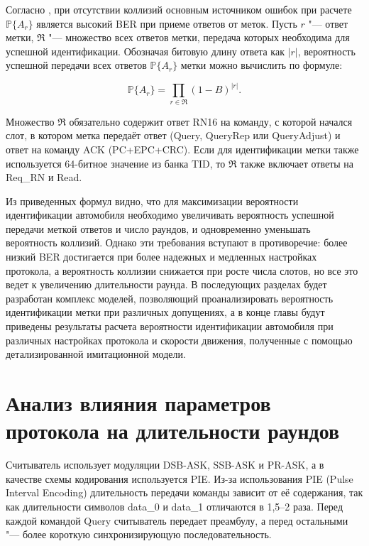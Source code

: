 Согласно \cite{Nikitin2008}, при отсутствии коллизий основным источником ошибок при расчете $\mathbb{P}\{A_r\}$ является высокий BER при приеме ответов от меток. Пусть $r$ "--- ответ метки, $\mathfrak{R}$ "--- множество всех ответов метки, передача которых необходима для успешной идентификации. Обозначая битовую длину ответа как $|r|$, вероятность успешной передачи всех ответов $\mathbb{P}\{A_r\}$ метки можно вычислить по формуле:

$$
	\mathbb{P}\{A_r\}=\prod_{r \in \mathfrak{R}}(1-B)^{|r|}.
$$

Множество $\mathfrak{R}$ обязательно содержит ответ RN16 на команду, с которой начался слот, в котором метка передаёт ответ (Query, QueryRep или QueryAdjust) и ответ на команду ACK (PC+EPC+CRC). Если для идентификации метки также используется 64-битное значение из банка TID, то $\mathfrak{R}$ также включает ответы на Req\_RN и Read.

Из приведенных формул видно, что для максимизации вероятности идентификации автомобиля необходимо увеличивать вероятность успешной передачи меткой ответов и число раундов, и одновременно уменьшать вероятность коллизий. Однако эти требования вступают в противоречие: более низкий BER достигается при более надежных и медленных настройках протокола, а вероятность коллизии снижается при росте числа слотов, но все это ведет к увеличению длительности раунда. В последующих разделах будет разработан комплекс моделей, позволяющий проанализировать вероятность идентификации метки при различных допущениях, а в конце главы будут приведены результаты расчета вероятности идентификации автомобиля при различных настройках протокола и скорости движения, полученные с помощью детализированной имитационной модели.







\section{Анализ влияния параметров протокола на длительности раундов}\label{sec:ch2_durations}
Считыватель использует модуляции DSB-ASK, SSB-ASK и PR-ASK, а в качестве схемы кодирования используется PIE. Из-за использования PIE (Pulse Interval Encoding) длительность передачи команды зависит от её содержания, так как длительности символов data\_0 и data\_1 отличаются в 1,5--2 раза. Перед каждой командой Query считыватель передает преамбулу, а перед остальными "--- более короткую синхронизирующую последовательность.

